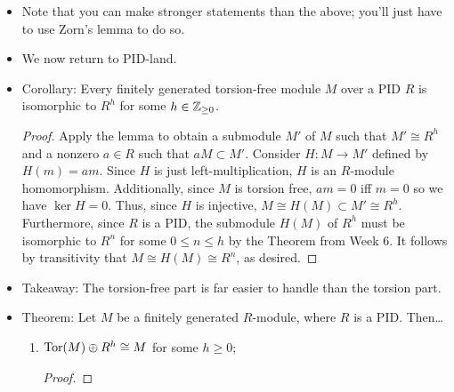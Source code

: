 \documentclass[../notes.tex]{subfiles}
\begin{document}
\begin{itemize}
\begin{enumerate}[label={(\roman*)}]
\begin{proof}
            \begin{equation*}
                a = \prod_{w\in S}a_w
            \end{equation*}
            Since $R$ is an integral domain by hypothesis and each $a_w$ in the above product is nonzero, $a$ is nonzero. Moreover, by its construction, $aw\in M'$ for all $w\in S$. Therefore,
            \begin{equation*}
                aM = a\left( \sum_{s\in S}As \right)
                \subset M'
            \end{equation*}
            as desired.
        \end{proof}
    \end{enumerate}
    \item Note that you can make stronger statements than the above; you'll just have to use Zorn's lemma to do so.
    \item We now return to PID-land.
    \item Corollary: Every finitely generated torsion-free module $M$ over a PID $R$ is isomorphic to $R^h$ for some $h\in{\mathbb{Z}_{\geq 0}}$.
    \begin{proof}

        Apply the lemma to obtain a submodule $M'$ of $M$ such that $M'\cong R^h$ and a nonzero $a\in R$ such that $aM\subset M'$. Consider $H:M\to M'$ defined by $H(m)=am$. Since $H$ is just left-multiplication, $H$ is an $R$-module homomorphism. Additionally, since $M$ is torsion free, $am=0$ iff $m=0$ so we have $\ker H=0$. Thus, since $H$ is injective, $M\cong H(M)\subset M'\cong R^h$. Furthermore, since $R$ is a PID, the submodule $H(M)$ of $R^h$ must be isomorphic to $R^n$ for some $0\leq n\leq h$ by the Theorem from Week 6. It follows by transitivity that $M\cong H(M)\cong R^n$, as desired.
    \end{proof}
    \item Takeaway: The torsion-free part is far easier to handle than the torsion part.
    \item Theorem: Let $M$ be a finitely generated $R$-module, where $R$ is a PID. Then\dots
    \begin{enumerate}[label={(\roman*)}]
        \item $\operatorname{Tor}(M)\oplus R^h\cong M$ for some $h\geq 0$;
        \begin{proof}


\end{proof}
\end{enumerate}
\end{itemize}
\end{document}
